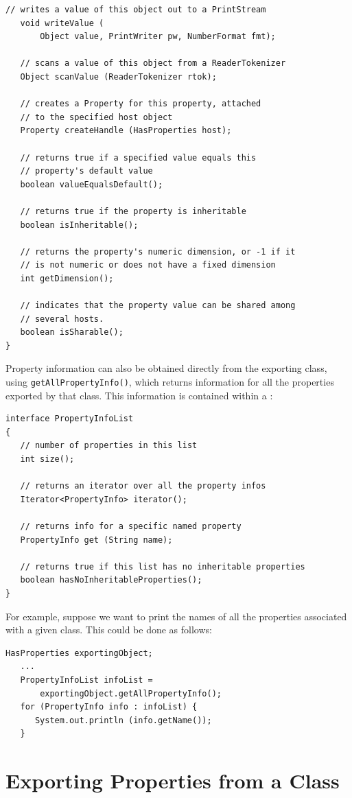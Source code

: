 \begin{lstlisting}[]
   // writes a value of this object out to a PrintStream
   void writeValue (
       Object value, PrintWriter pw, NumberFormat fmt);

   // scans a value of this object from a ReaderTokenizer
   Object scanValue (ReaderTokenizer rtok);

   // creates a Property for this property, attached
   // to the specified host object
   Property createHandle (HasProperties host);

   // returns true if a specified value equals this
   // property's default value
   boolean valueEqualsDefault();

   // returns true if the property is inheritable
   boolean isInheritable();

   // returns the property's numeric dimension, or -1 if it
   // is not numeric or does not have a fixed dimension
   int getDimension();

   // indicates that the property value can be shared among
   // several hosts.
   boolean isSharable();
}
\end{lstlisting}

Property information can also be obtained directly from the exporting
class, using {\tt getAllPropertyInfo()}, which returns
information for all the properties exported by that class. This
information is contained within a 
:
\begin{lstlisting}[]
interface PropertyInfoList
{
   // number of properties in this list
   int size(); 

   // returns an iterator over all the property infos
   Iterator<PropertyInfo> iterator();

   // returns info for a specific named property
   PropertyInfo get (String name);

   // returns true if this list has no inheritable properties
   boolean hasNoInheritableProperties();
}
\end{lstlisting}
For example, suppose we want to print the names of all the
properties associated with a given class. This could
be done as follows:
\begin{lstlisting}[]
   HasProperties exportingObject;
   ...
   PropertyInfoList infoList = 
       exportingObject.getAllPropertyInfo();
   for (PropertyInfo info : infoList) {
      System.out.println (info.getName());
   }
\end{lstlisting}

\label{exportingSec}
\section{Exporting Properties from a Class }


